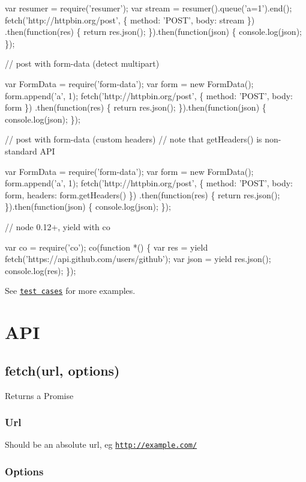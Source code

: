 \begin{DoxyCode}
var resumer = require('resumer');
var stream = resumer().queue('a=1').end();
fetch('http://httpbin.org/post', \{ method: 'POST', body: stream \})
    .then(function(res) \{
        return res.json();
    \}).then(function(json) \{
        console.log(json);
    \});

// post with form-data (detect multipart)

var FormData = require('form-data');
var form = new FormData();
form.append('a', 1);
fetch('http://httpbin.org/post', \{ method: 'POST', body: form \})
    .then(function(res) \{
        return res.json();
    \}).then(function(json) \{
        console.log(json);
    \});

// post with form-data (custom headers)
// note that getHeaders() is non-standard API

var FormData = require('form-data');
var form = new FormData();
form.append('a', 1);
fetch('http://httpbin.org/post', \{ method: 'POST', body: form, headers: form.getHeaders() \})
    .then(function(res) \{
        return res.json();
    \}).then(function(json) \{
        console.log(json);
    \});

// node 0.12+, yield with co

var co = require('co');
co(function *() \{
    var res = yield fetch('https://api.github.com/users/github');
    var json = yield res.json();
    console.log(res);
\});
\end{DoxyCode}


See \href{https://github.com/bitinn/node-fetch/blob/master/test/test.js}{\tt test cases} for more examples.

\section*{A\+PI}

\subsection*{fetch(url, options)}

Returns a {\ttfamily Promise}

\subsubsection*{Url}

Should be an absolute url, eg {\ttfamily \href{http://example.com/}{\tt http\+://example.\+com/}}

\subsubsection*{Options}

